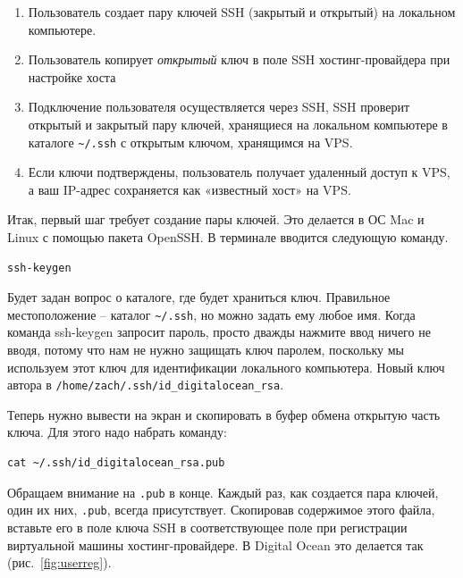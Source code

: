 \documentclass[12pt]{article}
\providecommand{\tightlist}{%
  \setlength{\itemsep}{0pt}\setlength{\parskip}{0pt}}
\begin{document}
\begin{enumerate}
\tightlist
\item
  Пользователь создает пару ключей SSH (закрытый и открытый) на
  локальном компьютере.
\item
  Пользователь копирует \emph{открытый} ключ в поле SSH
  хостинг-провайдера при настройке хоста
\item
  Подключение пользователя осуществляется через SSH, SSH проверит
  открытый и закрытый пару ключей, хранящиеся на локальном компьютере в
  каталоге \texttt{\textasciitilde{}/.ssh} с открытым ключом, хранящимся
  на VPS.
\item
  Если ключи подтверждены, пользователь получает удаленный доступ к VPS,
  а ваш IP-адрес сохраняется как «известный хост» на VPS.
\end{enumerate}

Итак, первый шаг требует создание пары ключей. Это делается в ОС Mac и
Linux с помощью пакета OpenSSH. В терминале вводится следующую команду.

\begin{verbatim}
ssh-keygen
\end{verbatim}

Будет задан вопрос о каталоге, где будет храниться ключ. Правильное
местоположение -- каталог \texttt{\textasciitilde{}/.ssh}, но можно
задать ему любое имя. Когда команда ssh-keygen запросит пароль, просто
дважды нажмите ввод ничего не вводя, потому что нам не нужно защищать
ключ паролем, поскольку мы используем этот ключ для идентификации
локального компьютера. Новый ключ автора в
\texttt{/home/zach/.ssh/id\_digitalocean\_rsa}.

Теперь нужно вывести на экран и скопировать в буфер обмена открытую
часть ключа. Для этого надо набрать команду:

\begin{verbatim}
cat ~/.ssh/id_digitalocean_rsa.pub
\end{verbatim}

Обращаем внимание на \texttt{.pub} в конце. Каждый раз, как создается
пара ключей, один их них, \texttt{.pub}, всегда присутствует. Скопировав
содержимое этого файла, вставьте его в поле ключа SSH в соответствующее
поле при регистрации виртуальной машины хостинг-провайдере. В Digital
Ocean это делается так (рис.~\ref{fig:userreg}).
\end{document}
